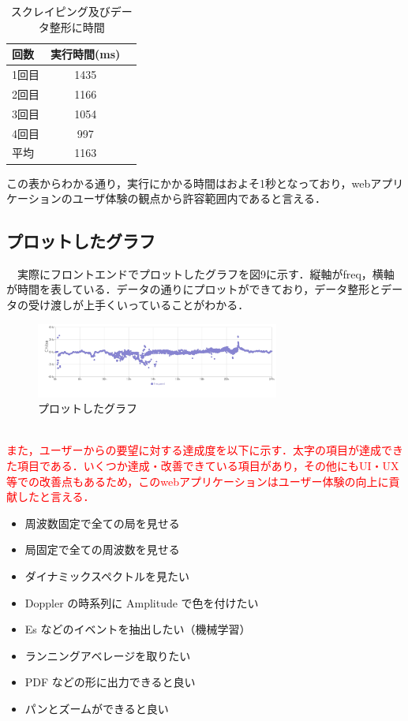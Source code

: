 \begin{table}[ht]
	\caption{スクレイピング及びデータ整形に時間}
	\centering
	\begin{tabular}{lcr}
		\hline
		回数  & 実行時間(ms) \\
		\hline \hline
		1回目 & 1435     \\
		2回目 & 1166     \\
		3回目 & 1054     \\
		4回目 & 997      \\
		\hline
		平均  & 1163
	\end{tabular}
\end{table}
この表からわかる通り，実行にかかる時間はおよそ1秒となっており，webアプリケーションのユーザ体験の観点から許容範囲内であると言える．\\


 
\subsection{プロットしたグラフ}
　実際にフロントエンドでプロットしたグラフを図9に示す．縦軸がfreq，横軸が時間を表している．データの通りにプロットができており，データ整形とデータの受け渡しが上手くいっていることがわかる．\\
 \begin{figure}[ht]
   \centering
   \includegraphics[width=80mm]{fig/graph.png}
      \caption{プロットしたグラフ}
 \end{figure}\\

\textcolor{red}{また，ユーザーからの要望に対する達成度を以下に示す．太字の項目が達成できた項目である．いくつか達成・改善できている項目があり，その他にもUI・UX等での改善点もあるため，このwebアプリケーションはユーザー体験の向上に貢献したと言える．}
\begin{itemize}
\item 周波数固定で全ての局を見せる
\item 局固定で全ての周波数を見せる
\item ダイナミックスペクトルを見たい
\item Doppler の時系列に Amplitude で色を付けたい
\item Es などのイベントを抽出したい（機械学習）
\item ランニングアベレージを取りたい
\item PDF などの形に出力できると良い
\item パンとズームができると良い
\end{itemize}

